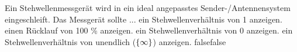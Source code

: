     {Ein Stehwellenmessgerät wird in ein ideal angepasstes Sender-/Antennensystem eingeschleift. Das Messgerät sollte ...}
    {ein Stehwellenverhältnis von 1 anzeigen.}
    {einen Rücklauf von 100 \% anzeigen.}
    {ein Stehwellenverhältnis von 0 anzeigen.}
    {ein Stehwellenverhältnis von unendlich ($\mathrm\{\infty\}$) anzeigen.}
    {false}{false}